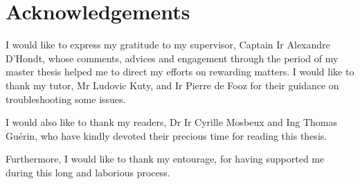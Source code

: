 \chapter*{Acknowledgements}
\thispagestyle{empty}

\vspace{-3cm}
\vfill

\begin{center}
\begin{minipage}{15cm}
I would like to express my gratitude to my supervisor, Captain Ir Alexandre D'Hondt, whose comments, advices and engagement through the period of my master thesis helped me to direct my efforts on rewarding matters. I would like to thank my tutor, Mr Ludovic Kuty, and Ir Pierre de Fooz for their guidance on troubleshooting some issues.
\newline

I would also like to thank my readers, Dr Ir Cyrille Mosbeux and Ing Thomas Guérin, who have kindly devoted their precious time for reading this thesis.
\newline

Furthermore, I would like to thank my entourage, for having supported me during this long and laborious process.
\end{minipage}
\end{center}

\vfill

